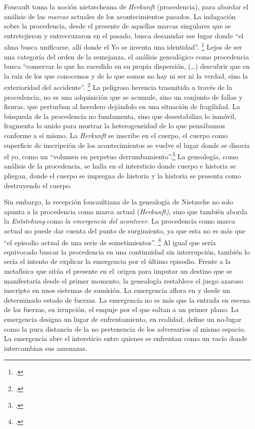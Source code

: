Foucault toma la noción nietzscheana de \emph{Herkunft} (procedencia), para abordar el análisis de las \emph{marcas} actuales de los acontecimientos pasados. La indagación sobre la procedencia, desde el presente de aquellas marcas singulares que se entretejieron y entrecruzaron en el pasado, busca desanudar ese lugar donde \enquote{el alma busca unificarse, allí donde el Yo se inventa una identidad}. \footcite[][26]{@7047-FOUCAULT2008} Lejos de ser una categoría del orden de la semejanza, el análisis genealógico como procedencia busca \enquote{conservar lo que ha sucedido en su propia dispersión, (\ldots) descubrir que en la raíz de los que conocemos y de lo que somos no hay ni ser ni la verdad, sino la exterioridad del accidente}. \footcite[][27-28]{@7047-FOUCAULT2008} La peligrosa herencia trasmitida a través de la procedencia, no es una adquisición que se acumule, sino un conjunto de fallas y fisuras, que perturban al heredero dejándolo en una situación de fragilidad. La búsqueda de la procedencia no fundamenta, sino que desestabiliza lo inmóvil, fragmenta lo unido para mostrar la heterogeneidad de lo que pensábamos conforme a sí mismo. La \emph{Herkunft} se inscribe en el cuerpo, el cuerpo como superficie de inscripción de los acontecimientos se vuelve el lugar donde se disocia el yo, como un \enquote{volumen en perpetuo derrumbamiento}.\footcite[][30]{@7047-FOUCAULT2008} La genealogía, como análisis de la procedencia, se halla en el intersticio donde cuerpo e historia se pliegan, donde el cuerpo se impregna de historia y la historia se presenta como destruyendo el cuerpo.

Sin embargo, la recepción foucaultiana de la genealogía de Nietzsche no solo apunta a la procedencia como marca actual (\emph{Herkunft)}, sino que también aborda la \emph{Entstehung} como \emph{la emergencia del acontecer}. La procedencia como marca actual no puede dar cuenta del punto de surgimiento, ya que esta no es más que \enquote{el episodio actual de una serie de sometimientos}. \footcite[][33]{@7047-FOUCAULT2008} Al igual que sería equivocado buscar la procedencia en una continuidad sin interrupción, también lo sería el intento de explicar la emergencia por el último episodio. Frente a la metafísica que sitúa el presente en el~origen para imputar un destino que se manifestaría desde el primer momento, la genealogía restablece el juego azaroso inscripto en unos sistemas de sumisión. La emergencia aflora en y desde un determinado estado de fuerzas. La emergencia no es más que la entrada en escena de las fuerzas, su irrupción, el empuje por el que saltan a un primer plano. La emergencia designa un lugar de enfrentamiento, en realidad, define un no-lugar como la pura distancia de la no pertenencia de los adversarios al mismo espacio. La emergencia abre el intersticio entre quienes se enfrentan como un vacío donde intercambian sus amenazas.

